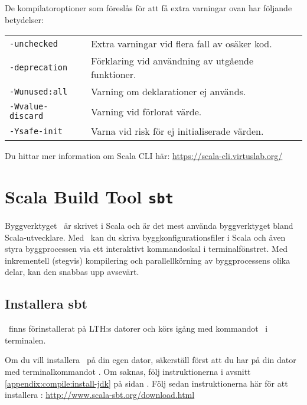 \noindent De kompilatoroptioner som föreslås för att få extra varningar ovan har följande betydelser:
\begin{table}[H]
\begin{tabular}{l p{8.5cm}}
\texttt{-unchecked} & Extra varningar vid flera fall av osäker kod. \\
\texttt{-deprecation} & Förklaring vid användning av utgående funktioner. \\
\texttt{-Wunused:all} & Varning om deklarationer ej används. \\
\texttt{-Wvalue-discard} & Varning vid förlorat värde. \\
\texttt{-Ysafe-init} & Varna vid risk för ej initialiserade värden. \\
\end{tabular}
\end{table}

\noindent Du hittar mer information om Scala CLI här: \url{https://scala-cli.virtuslab.org/}



\section{Scala Build Tool \texttt{sbt}}\label{appendix:build:sbt}

Byggverktyget \sbt\ är skrivet i Scala och är det mest använda byggverktyget bland Scala-utvecklare. Med \sbt\ kan du skriva byggkonfigurationsfiler i Scala och även styra byggprocessen via ett interaktivt kommandoskal i terminalfönstret. Med inkrementell (stegvis) kompilering och parallellkörning av byggprocessens olika delar, kan den snabbas upp avsevärt.


\subsection{Installera sbt}

\sbt\ finns förinstallerat på LTH:s datorer och körs igång med kommandot \sbt\ i terminalen.

Om du vill installera \sbt\ på din egen dator,
säkerställ först att du har  på din dator med terminalkommandot . Om  saknas, följ instruktionerna i avsnitt \ref{appendix:compile:install-jdk} på sidan \pageref{appendix:compile:install-jdk}.
Följ sedan instruktionerna här för att installera \sbt: \url{http://www.scala-sbt.org/download.html}

